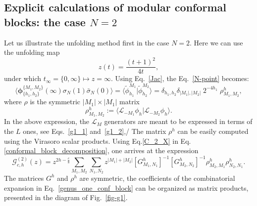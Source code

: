 \documentclass[a4paper,11pt]{article}
\begin{document}
 

\subsection{Explicit calculations of modular conformal blocks: the case $N=2$}
Let us illustrate the unfolding method first in the case $N=2$. Here  we can use the unfolding  map
\begin{equation}\label{g_one_covering_map}
 z(t)=\frac{(t+1)^2}{4t},
\end{equation}
under which  $t_{\infty}=\{0,\infty\}\mapsto z=\infty$.
Using Eq.~\eqref{Jac}, the  Eq.~\eqref{N-point}  becomes:
\begin{equation}\label{C_2_X}
 \langle \boldsymbol{\phi}^{\{M_1,M_2\}}_{\{h_1,h_2\}}(\infty) \sigma_{N}(1)\bar{\sigma}_{N}(0)\rangle=\langle \tilde{\phi}_{h_1}^{M_1} | \tilde{\phi}_{h_2}^{M_2}\rangle=
 \delta_{h_1, h_2}\delta_{|M_1|,|M_2|}\;2^{-4 h_1} \;\rho^h_{M_1,M_2},
\end{equation}
where $\rho$ is the symmetric $|M_1|\times|M_1|$ matrix
\begin{equation}
\label{rho}
 \rho^h_{M_1,M_2}:=\langle \mathcal{L}_{-M_1}\phi_{h}|\mathcal{L}_{-M_2}\phi_{h}\rangle.
\end{equation}
In the above expression,  the $\mathcal{L}_M$ generators are meant to be expressed in terms of the $L$  ones, see Eqs.~\eqref{g1_1} and~\eqref{g1_2},/ The matrix $\rho^h$  can be easily computed using the Virasoro scalar products.
Using Eq.\eqref{C_2_X} in Eq.\eqref{conformal_block_decomposition}, one arrives at the expression
\begin{equation}\label{genus_one_conf_block}
 \mathcal{G}_{c, h}^{(2)}(z)=z^{2h-\frac{c}{8}}\sum_{M_1, M_2}\sum_{N_1, N_2}
 z^{|M_1|+|M_2|}[G^{h}_{M_1,N_1}]^{-1}[G^{h}_{ M_2,N_2}]^{-1}
 \rho^h_{M_2,M_1}\rho^h_{N_2,N_1}.
\end{equation}
The matrices $G^h$ and $\rho^h$ are symmetric, the coefficients of the combinatorial 
expansion in Eq.~\eqref{genus_one_conf_block} can be organized as 
matrix products, presented in the diagram of Fig.~\ref{fig-g1}. 
\end{document}
